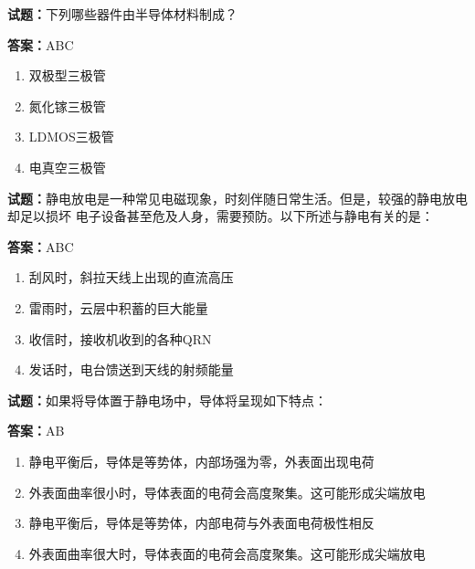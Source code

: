 \documentclass{ctexbook}
\begin{document}




\vspace{1em}

\textbf{试题：}下列哪些器件由半导体材料制成？ 

\textbf{答案：}ABC 

\begin{enumerate}[leftmargin=3em]
  \item 双极型三极管 

  \item 氮化镓三极管 


  \item LDMOS三极管 

  \item 电真空三极管 

\end{enumerate}





\vspace{1em}

\textbf{试题：}静电放电是一种常见电磁现象，时刻伴随日常生活。但是，较强的静电放电却足以损坏
电子设备甚至危及人身，需要预防。以下所述与静电有关的是： 

\textbf{答案：}ABC 

\begin{enumerate}[leftmargin=3em]
  \item 刮风时，斜拉天线上出现的直流高压 

  \item 雷雨时，云层中积蓄的巨大能量 

  \item 收信时，接收机收到的各种QRN 

  \item 发话时，电台馈送到天线的射频能量 

\end{enumerate}





\vspace{1em}

\textbf{试题：}如果将导体置于静电场中，导体将呈现如下特点： 

\textbf{答案：}AB 

\begin{enumerate}[leftmargin=3em]
  \item 静电平衡后，导体是等势体，内部场强为零，外表面出现电荷 

  \item 外表面曲率很小时，导体表面的电荷会高度聚集。这可能形成尖端放电 

  \item 静电平衡后，导体是等势体，内部电荷与外表面电荷极性相反 

  \item 外表面曲率很大时，导体表面的电荷会高度聚集。这可能形成尖端放电 

\end{enumerate}
\end{document}
